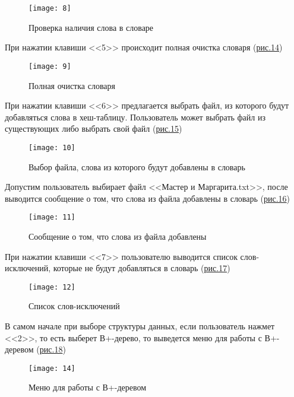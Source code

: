 \documentclass[10pt,a4paper,final]{article} %
\begin{document}
\begin{figure}[htbp]
	\centering
	\texttt{[image: 8]}
	\caption{Проверка наличия слова в словаре}
	\label{fig:8}
\end{figure}

\newpage
При нажатии клавиши <<5>> происходит полная очистка словаря (\hyperref[fig:9]{рис.14})

\begin{figure}[htbp]
	\centering
	\texttt{[image: 9]}
	\caption{Полная очистка словаря}
	\label{fig:9}
\end{figure}

При нажатии клавиши <<6>> предлагается выбрать файл, из которого будут добавляться слова в хеш-таблицу. Пользователь может выбрать файл из существующих либо выбрать свой файл (\hyperref[fig:10]{рис.15})

\begin{figure}[htbp]
	\centering
	\texttt{[image: 10]}
	\caption{Выбор файла, слова из которого будут добавлены в словарь}
	\label{fig:10}
\end{figure}

Допустим пользователь выбирает файл <<Мастер и Маргарита.txt>>, после выводится сообщение о том, что слова из файла добавлены в словарь (\hyperref[fig:11]{рис.16})

\begin{figure}[htbp]
	\centering
	\texttt{[image: 11]}
	\caption{Сообщение о том, что слова из файла добавлены}
	\label{fig:11}
\end{figure}

\newpage
При нажатии клавиши <<7>> пользователю выводится список слов-исключений, которые не будут добавляться в словарь (\hyperref[fig:12]{рис.17})

\begin{figure}[htbp]
	\centering
	\texttt{[image: 12]}
	\caption{Список слов-исключений}
	\label{fig:12}
\end{figure}

В самом начале при выборе структуры данных, если пользователь нажмет <<2>>, то есть выберет В+-дерево, то выведется меню для работы с В+-деревом  (\hyperref[fig:13]{рис.18})

\begin{figure}[htbp]
	\centering
	\texttt{[image: 14]}
	\caption{Меню для работы с В+-деревом}
	\label{fig:13}
\end{figure}
\end{document}
